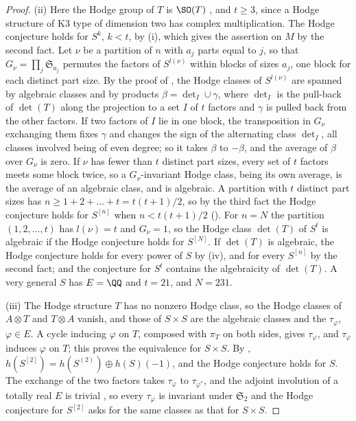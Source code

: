 \begin{proof}
(ii) Here the Hodge group of $T$ is $\SO(T)$ \cite{Zar83}, and $t\ge3$,
since a Hodge structure of K3 type of dimension two has complex
multiplication. The Hodge conjecture holds for $S^{k}$, $k<t$, by
(i), which gives the assertion on $M$ by the second
fact. Let $\nu$ be a partition of $n$ with $a_{j}$ parts equal to $j$, so
that $G_{\nu}=\prod_{j}\mathfrak{S}_{a_{j}}$ permutes the factors of
$S^{l(\nu)}$ within blocks of sizes $a_{j}$, one block for each distinct part
size. By the proof of , the Hodge classes of
$S^{l(\nu)}$ are spanned by algebraic classes and by products
$\beta=\det_{I}\cup\gamma$, where $\det_{I}$ is the pull-back of $\det(T)$
along the projection to a set $I$ of $t$ factors and $\gamma$ is pulled back
from the other factors. If two factors of $I$ lie in one block, the
transposition in $G_{\nu}$ exchanging them fixes $\gamma$ and changes the
sign of the alternating class $\det_{I}$, all classes involved being of even
degree; so it takes $\beta$ to $-\beta$, and the average of $\beta$ over
$G_{\nu}$ is zero. If $\nu$ has fewer than $t$ distinct part sizes, every set
of $t$ factors meets some block twice, so a $G_{\nu}$-invariant Hodge class,
being its own average, is the average of an algebraic class, and is
algebraic. A partition with $t$ distinct part sizes has
$n\ge1+2+\dots+t=t(t+1)/2$, so by the third fact the Hodge conjecture holds
for $S^{[n]}$ when $n<t(t+1)/2$ (). For $n=N$ the
partition $(1,2,\dots,t)$ has
$l(\nu)=t$ and $G_{\nu}=1$, so the Hodge class $\det(T)$ of $S^{t}$ is
algebraic if the Hodge conjecture holds for $S^{[N]}$. If $\det(T)$ is
algebraic, the Hodge conjecture holds for every power of $S$ by
(iv), and for every $S^{[n]}$ by the second fact; and
the conjecture for $S^{t}$ contains the algebraicity of $\det(T)$. A very
general $S$ has $E=\QQ$ and $t=21$, and $N=231$.

(iii) The Hodge structure $T$ has no nonzero Hodge class, so the Hodge
classes of $A\otimes T$ and $T\otimes A$ vanish, and those of $S\times S$
are the algebraic classes and the $\tau_{\varphi}$, $\varphi\in E$. A cycle
inducing $\varphi$ on $T$, composed with $\pi_{T}$ on both sides, gives
$\tau_{\varphi}$, and $\tau_{\varphi}$ induces $\varphi$ on $T$; this proves
the equivalence for $S\times S$. By \cite{dCM02},
$h(S^{[2]})=h(S^{(2)})\oplus h(S)(-1)$, and the Hodge conjecture holds for
$S$. The exchange of the two factors takes $\tau_{\varphi}$ to
$\tau_{\varphi^{*}}$, and the adjoint involution of a totally real $E$ is
trivial \cite{Zar83}, so every $\tau_{\varphi}$ is invariant under
$\mathfrak{S}_{2}$ and the Hodge conjecture for $S^{[2]}$ asks for the same
classes as that for $S\times S$.
\end{proof}

